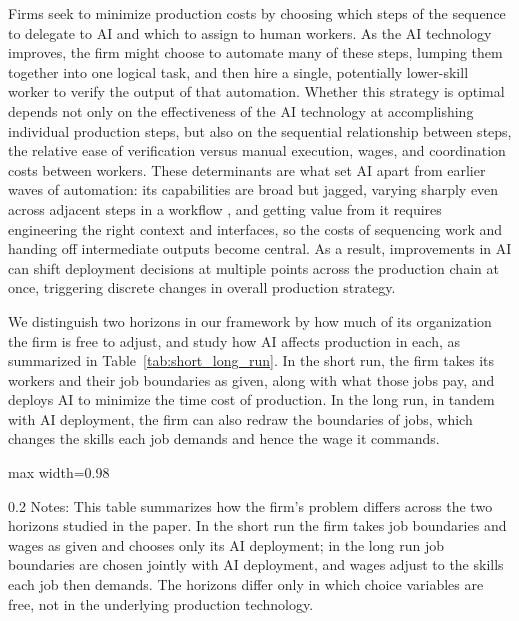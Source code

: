 Firms seek to minimize production costs by choosing which steps of the sequence to delegate to AI and which to assign to human workers.
As the AI technology improves, the firm might choose to automate many of these steps, lumping them together into one logical task, and then hire a single, potentially lower-skill worker to verify the output of that automation.
Whether this strategy is optimal depends not only on the effectiveness of the AI technology at accomplishing individual production steps, but also on the sequential relationship between steps, the relative ease of verification versus manual execution, wages, and coordination costs between workers.
These determinants are what set AI apart from earlier waves of automation: its capabilities are broad but jagged, varying sharply even across adjacent steps in a workflow \citep{dell2023navigating}, and getting value from it requires engineering the right context and interfaces, so the costs of sequencing work and handing off intermediate outputs become central.
As a result, improvements in AI can shift deployment decisions at multiple points across the production chain at once, triggering discrete changes in overall production strategy.

We distinguish two horizons in our framework by how much of its organization the firm is free to adjust, and study how AI affects production in each, as summarized in Table~\ref{tab:short_long_run}.
In the short run, the firm takes its workers and their job boundaries as given, along with what those jobs pay, and deploys AI to minimize the time cost of production.
In the long run, in tandem with AI deployment, the firm can also redraw the boundaries of jobs, which changes the skills each job demands and hence the wage it commands.
\begin{table}[!t]
    \centering
    \vspace{0.1cm}
    \caption{Summary of AI's Impact in the Short and Long Run}
    \label{tab:short_long_run}
    \footnotesize
    \begin{adjustbox}{max width=0.98\textwidth}
    
    \end{adjustbox}

    \begin{minipage}{1\linewidth}
\begin{spacing}{0.2}
{\fontsize{9.5pt}{10pt}\selectfont Notes: This table summarizes how the firm's problem differs across the two horizons studied in the paper. In the short run the firm takes job boundaries and wages as given and chooses only its AI deployment; in the long run job boundaries are chosen jointly with AI deployment, and wages adjust to the skills each job then demands. The horizons differ only in which choice variables are free, not in the underlying production technology.}
\end{spacing}
\end{minipage}
\end{table}


